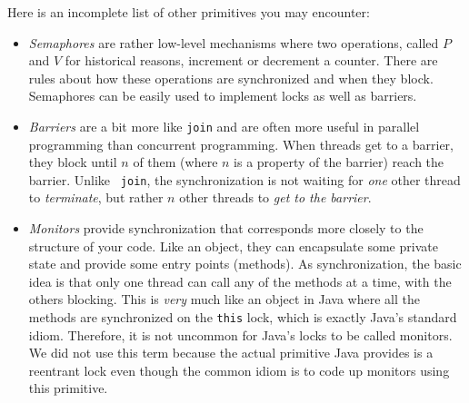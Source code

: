 \documentclass[10pt]{article}
\begin{document}
Here is an incomplete list of other primitives you may encounter:
\begin{itemize}
\item \emph{Semaphores} are rather low-level mechanisms where two
  operations, called $P$ and $V$ for historical reasons, increment or
  decrement a counter.  There are rules about how these operations are
  synchronized and when they block.  Semaphores can be easily used to
  implement locks as well as barriers.
\item \emph{Barriers} are a bit more like {\tt join} and are often
  more useful in parallel programming than concurrent programming.
  When threads get to a barrier, they block until $n$ of them (where
  $n$ is a property of the barrier) reach the barrier.  Unlike {\tt
  join}, the synchronization is not waiting for \emph{one} other
  thread to \emph{terminate}, but rather $n$ other threads to
  \emph{get to the barrier}.
\item \emph{Monitors} provide synchronization that corresponds more
  closely to the structure of your code.  Like an object, they can
  encapsulate some private state and provide some entry points
  (methods).  As synchronization, the basic idea is that only one
  thread can call any of the methods at a time, with the others
  blocking.  This is \emph{very} much like an object in Java where all
  the methods are synchronized on the {\tt this} lock, which is
  exactly Java's standard idiom.  Therefore, it is not uncommon for
  Java's locks to be called monitors.  We did not use this term
  because the actual primitive Java provides is a reentrant lock even
  though the common idiom is to code up monitors using this primitive.
\end{itemize}
\end{document}
